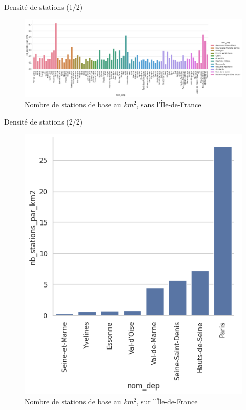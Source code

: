 \begin{frame}{Densité de stations (1/2)}
    \begin{figure}
        \includegraphics[width=0.9\paperwidth]{images/barplots/densite_station_par_dep_sansIDF.png}
        \caption{\label{fig:densite_stat_ssIDF}Nombre de stations de base au $\unit{km^2}$, sans l'Île-de-France}
    \end{figure}
\end{frame}

\begin{frame}{Densité de stations (2/2)}
    \begin{figure}
        \includegraphics[height=0.55\paperheight]{images/barplots/densite_station_par_dep_IDF.png}
        \caption{\label{fig:densite_stat_IDF}Nombre de stations de base au $\unit{km^2}$, sur l'Île-de-France}
    \end{figure}
\end{frame}


